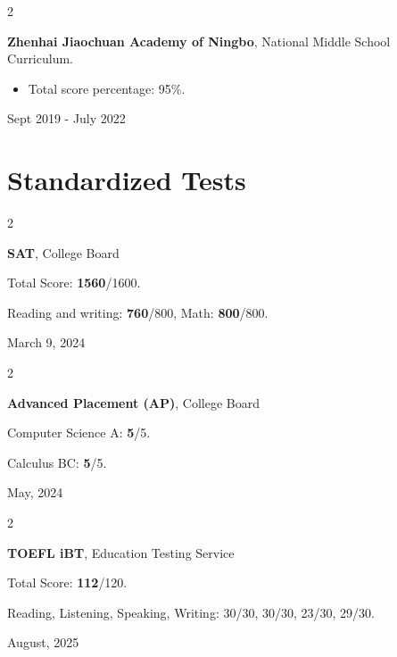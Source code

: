 \documentclass[10pt, letterpaper]{article}
\newenvironment{highlights}{
    \begin{itemize}[
        topsep=0.10 cm,
        parsep=0.10 cm,
        partopsep=0pt,
        itemsep=0pt,
        leftmargin=0.4 cm + 10pt
    ]
}{
    \end{itemize}
} %
\newenvironment{twocolentry}[2][]{
    \onecolentry
    \def\secondColumn{#2}
    \setcolumnwidth{\fill, 4.5 cm}
    \begin{paracol}{2}
}{
    \switchcolumn \raggedleft \secondColumn
    \end{paracol}
    \endonecolentry
} %
\begin{document}
        \begin{twocolentry}{ Sept 2019 - July 2022 }
            \textbf{Zhenhai Jiaochuan Academy of Ningbo}, National Middle School Curriculum.
            \begin{highlights}
                \item Total score percentage: 95\%.
            \end{highlights}
        \end{twocolentry}

    \section{Standardized Tests}
    \begin{twocolentry}{March 9, 2024}
        \setlength{\parindent}{20pt}

        \noindent\textbf{SAT}, College Board

        \vspace{5pt}

        Total Score: \textbf{1560}/1600. 

        Reading and writing: \textbf{760}/800, Math: \textbf{800}/800.
        
    \end{twocolentry}

    \vspace{0.2cm}

    \begin{twocolentry}{May, 2024}
        \setlength{\parindent}{20pt}

        \textbf{Advanced Placement (AP)}, College Board

        \vspace{5pt}

        Computer Science A: \textbf{5}/5.

        Calculus BC: \textbf{5}/5.
        
    \end{twocolentry}
    
    \vspace{0.2cm}

    \begin{twocolentry}{August, 2025}
        \setlength{\parindent}{20pt}

        \textbf{TOEFL iBT}, Education Testing Service

        \vspace{5pt}

        Total Score: \textbf{112}/120.

        Reading, Listening, Speaking, Writing: 30/30, 30/30, 23/30, 29/30.
        
    \end{twocolentry}
\end{document}

